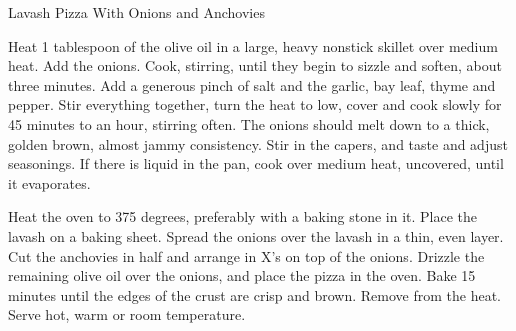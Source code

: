 \begin{recipe}{Lavash Pizza With Onions and Anchovies}

    \begin{ingredients}
    \end{ingredients}

    \begin{instructions}
        Heat 1 tablespoon of the olive oil in a large, heavy nonstick skillet over medium heat. Add the onions. Cook, stirring, until they begin to sizzle and soften, about three minutes. Add a generous pinch of salt and the garlic, bay leaf, thyme and pepper. Stir everything together, turn the heat to low, cover and cook slowly for 45 minutes to an hour, stirring often. The onions should melt down to a thick, golden brown, almost jammy consistency. Stir in the capers, and taste and adjust seasonings. If there is liquid in the pan, cook over medium heat, uncovered, until it evaporates.
    
        Heat the oven to 375 degrees, preferably with a baking stone in it. Place the lavash on a baking sheet. Spread the onions over the lavash in a thin, even layer. Cut the anchovies in half and arrange in X’s on top of the onions. Drizzle the remaining olive oil over the onions, and place the pizza in the oven. Bake 15 minutes until the edges of the crust are crisp and brown. Remove from the heat. Serve hot, warm or room temperature.
    \end{instructions}
\end{recipe}
